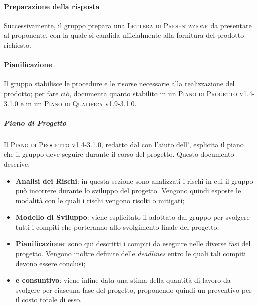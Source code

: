 \documentclass[../norme-di-progetto.tex]{subfiles}
\begin{document}
\paragraph{Preparazione della risposta}
Successivamente, il gruppo prepara una \textsc{Lettera di Presentazione} da presentare al proponente, con la quale si candida ufficialmente alla fornitura del prodotto richiesto.

\paragraph{Pianificazione}
Il gruppo stabilisce le procedure e le risorse necessarie alla realizzazione del prodotto; per fare ciò, documenta quanto stabilito in un \textsc{Piano di Progetto v1.4-3.1.0} e in un \textsc{Piano di Qualifica v1.9-3.1.0}.

\subparagraph*{Piano di Progetto}
Il \textsc{Piano di Progetto v1.4-3.1.0}, redatto dal  con l'aiuto dell', esplicita il piano che il gruppo deve seguire durante il corso del progetto. Questo documento descrive:
\begin{itemize}
  \item \textbf{Analisi dei Rischi}: in questa sezione sono analizzati i rischi in cui il gruppo può incorrere durante lo sviluppo del progetto. Vengono quindi esposte le modalità con le quali i rischi vengono risolti o mitigati;
  \item \textbf{Modello di Sviluppo}: viene esplicitato il  adottato dal gruppo per svolgere tutti i compiti che porteranno allo svolgimento finale del progetto;
  \item \textbf{Pianificazione}: sono qui descritti i compiti da eseguire nelle diverse fasi del progetto. Vengono inoltre definite delle \textit{deadlines} entro le quali tali compiti devono essere conclusi;
  \item \textbf{ e consuntivo}: viene infine data una stima della quantità di lavoro da svolgere per ciascuna fase del progetto, proponendo quindi un preventivo per il costo totale di esso.
\end{itemize}
\end{document}
